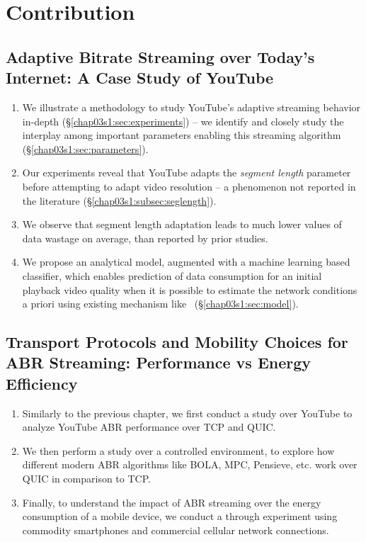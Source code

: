 \section{Contribution}
\subsection{Adaptive Bitrate Streaming over Today's Internet: A Case Study of YouTube}
\begin{enumerate}
	\item We illustrate a methodology to study YouTube's adaptive streaming behavior in-depth (\S\ref{chap03s1:sec:experiments}) -- we identify and closely study the interplay among important parameters enabling this streaming algorithm (\S\ref{chap03s1:sec:parameters}).
	\item Our experiments reveal that YouTube adapts the {\it segment length} parameter before attempting to adapt video resolution -- a phenomenon not reported in the literature (\S\ref{chap03s1:subsec:seglength}).
	\item We observe that segment length adaptation leads to much lower values of data wastage on average, than reported by prior studies.
	\item We propose an analytical model, augmented with a machine learning based classifier, which enables prediction of data consumption for an initial playback video quality when it is possible to estimate the network conditions a priori using existing mechanism like~\cite{Zou2015}  (\S\ref{chap03s1:sec:model}).
\end{enumerate}

\subsection{Transport Protocols and Mobility Choices for ABR Streaming: Performance vs Energy Efficiency}
\begin{enumerate}
	\item Similarly to the previous chapter, we first conduct a study over YouTube to analyze YouTube ABR performance over TCP and QUIC. 
	\item We then perform a study over a controlled environment, to explore how different modern ABR algorithms like BOLA, MPC, Pensieve, etc. work over QUIC in comparison to TCP. 
	\item Finally, to understand the impact of ABR streaming over the energy consumption of a mobile device, we conduct a through experiment using commodity smartphones and commercial cellular network connections. 
\end{enumerate}

